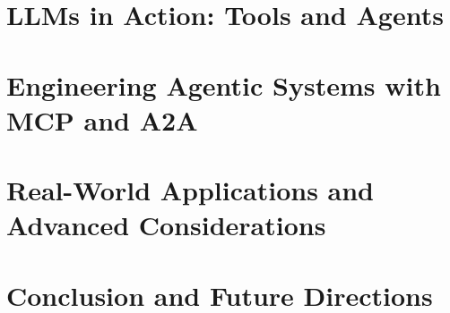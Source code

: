 \documentclass{book}
\begin{document}
	

	\part{LLMs in Action: Tools and Agents}
	
	
	
	
	
	
	
	
	
	
	
	\part{Engineering Agentic Systems with MCP and A2A}
	
	
	
	
	
	\part{Real-World Applications and Advanced Considerations}
	
	

	\part{ Conclusion and Future Directions}
	
	
	\begin{refsection}
		\nocite{*} 
		\printbibliography[title={References}]
	\end{refsection}
\end{document}
